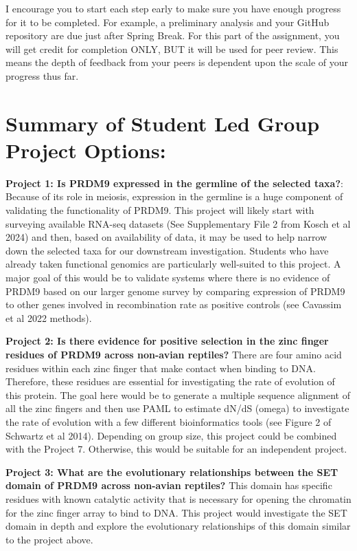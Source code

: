 \documentclass[
  letterpaper,
  DIV=11,
  numbers=noendperiod]{scrreprt}
\begin{document}
I encourage you to start each step early to make sure you have enough
progress for it to be completed. For example, a preliminary analysis and
your GitHub repository are due just after Spring Break. For this part of
the assignment, you will get credit for completion ONLY, BUT it will be
used for peer review. This means the depth of feedback from your peers
is dependent upon the scale of your progress thus far.

\section{Summary of Student Led Group Project
Options:}\label{summary-of-student-led-group-project-options}

\textbf{Project 1: Is PRDM9 expressed in the germline of the selected
taxa?}: Because of its role in meiosis, expression in the germline is a
huge component of validating the functionality of PRDM9. This project
will likely start with surveying available RNA-seq datasets (See
Supplementary File 2 from Kosch et al 2024) and then, based on
availability of data, it may be used to help narrow down the selected
taxa for our downstream investigation. Students who have already taken
functional genomics are particularly well-suited to this project. A
major goal of this would be to validate systems where there is no
evidence of PRDM9 based on our larger genome survey by comparing
expression of PRDM9 to other genes involved in recombination rate as
positive controls (see Cavassim et al 2022 methods).

\textbf{Project 2: Is there evidence for positive selection in the zinc
finger residues of PRDM9 across non-avian reptiles?} There are four
amino acid residues within each zinc finger that make contact when
binding to DNA. Therefore, these residues are essential for
investigating the rate of evolution of this protein. The goal here would
be to generate a multiple sequence alignment of all the zinc fingers and
then use PAML to estimate dN/dS (omega) to investigate the rate of
evolution with a few different bioinformatics tools (see Figure 2 of
Schwartz et al 2014). Depending on group size, this project could be
combined with the Project 7. Otherwise, this would be suitable for an
independent project.

\textbf{Project 3: What are the evolutionary relationships between the
SET domain of PRDM9 across non-avian reptiles?} This domain has specific
residues with known catalytic activity that is necessary for opening the
chromatin for the zinc finger array to bind to DNA. This project would
investigate the SET domain in depth and explore the evolutionary
relationships of this domain similar to the project above.
\end{document}
